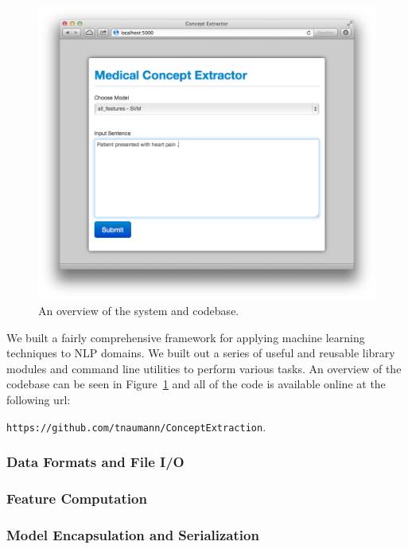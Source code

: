 \documentclass[preprint]{style}
\begin{document}
\begin{figure}
\begin{center}
	\includegraphics[width=1\columnwidth]{figures/system.png}
\end{center}
\caption{An overview of the system and codebase.}
\label{fig:system}
\end{figure}


We built a fairly comprehensive framework for applying machine learning techniques to NLP domains. We built out a series of useful and reusable library modules and command line utilities to perform various tasks. An overview of the codebase can be seen in Figure~\ref{fig:system} and  all of the code is available online at the following url:

{\tt https://github.com/tnaumann/ConceptExtraction}.

\subsubsection{Data Formats and File I/O}

\subsubsection{Feature Computation}

\subsubsection{Model Encapsulation and Serialization}
\end{document}
